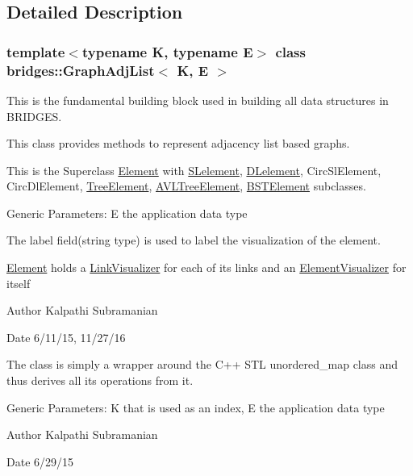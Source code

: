 \subsection{Detailed Description}
\subsubsection*{template$<$typename K, typename E$>$\newline
class bridges\+::\+Graph\+Adj\+List$<$ K, E $>$}

This is the fundamental building block used in building all data structures in B\+R\+I\+D\+G\+ES. 

This class provides methods to represent adjacency list based graphs.

This is the Superclass \hyperlink{classbridges_1_1_element}{Element} with \hyperlink{classbridges_1_1_s_lelement}{S\+Lelement}, \hyperlink{classbridges_1_1_d_lelement}{D\+Lelement}, Circ\+Sl\+Element, Circ\+Dl\+Element, \hyperlink{classbridges_1_1_tree_element}{Tree\+Element}, \hyperlink{classbridges_1_1_a_v_l_tree_element}{A\+V\+L\+Tree\+Element}, \hyperlink{classbridges_1_1_b_s_t_element}{B\+S\+T\+Element} subclasses.

Generic Parameters\+: E the application data type

The label field(string type) is used to label the visualization of the element.

\hyperlink{classbridges_1_1_element}{Element} holds a \hyperlink{classbridges_1_1_link_visualizer}{Link\+Visualizer} for each of its links and an \hyperlink{classbridges_1_1_element_visualizer}{Element\+Visualizer} for itself

\begin{DoxyAuthor}{Author}
Kalpathi Subramanian 
\end{DoxyAuthor}
\begin{DoxyDate}{Date}
6/11/15, 11/27/16
\end{DoxyDate}
The class is simply a wrapper around the C++ S\+TL unordered\+\_\+map class and thus derives all its operations from it.

Generic Parameters\+: K that is used as an index, E the application data type

\begin{DoxyAuthor}{Author}
Kalpathi Subramanian 
\end{DoxyAuthor}
\begin{DoxyDate}{Date}
6/29/15 
\end{DoxyDate}


